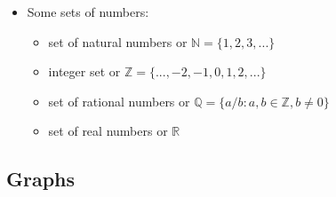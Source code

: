 \begin{itemize}
 \item Some sets of numbers:
 \begin{itemize}
 	\item set of natural numbers or $\mathbb{N} = \{1,2,3,...\}$
 	\item integer set or $\mathbb{Z} = \{...,-2,-1,0,1,2,...\}$
 	\item set of rational numbers or $\mathbb{Q} = \{a/b:a,b \in \mathbb{Z},b\neq 0 \}$
 	\item set of real numbers or $\mathbb{R}$
 \end{itemize}
\end{itemize}

\subsection{Graphs}
